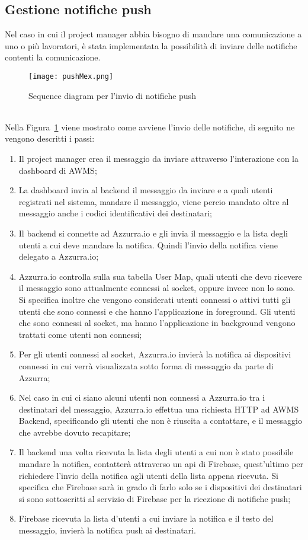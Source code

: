 \subsection{Gestione notifiche push}
Nel caso in cui il project manager abbia bisogno di mandare una comunicazione a uno o più lavoratori, è stata implementata la possibilità di inviare delle notifiche contenti la comunicazione.
\begin{figure}[h]
	\begin{center}
		\texttt{[image: pushMex.png]}
		\caption{Sequence diagram per l'invio di notifiche push}\label{fig:push}
	\end{center}
\end{figure}\\
Nella Figura~\ref{fig:push} viene mostrato come avviene l'invio delle notifiche, di seguito ne vengono descritti i passi:
\begin{enumerate}
	\item Il project manager crea il messaggio da inviare attraverso l'interazione con la dashboard di AWMS;
	\item La dashboard invia al backend il messaggio da inviare e a quali utenti registrati nel sistema, mandare il messaggio, viene percio mandato oltre al messaggio anche i codici identificativi dei destinatari;
	\item Il backend si connette ad Azzurra.io e gli invia il messaggio e la lista degli utenti a cui deve mandare la notifica. Quindi l'invio della notifica viene delegato a Azzurra.io; 
	\item Azzurra.io controlla sulla sua tabella User Map, quali utenti che devo ricevere il messaggio sono attualmente connessi al socket, oppure invece non lo sono. Si specifica inoltre che vengono considerati utenti connessi o attivi tutti gli utenti che sono connessi e che hanno l’applicazione in foreground. Gli utenti che sono connessi al socket, ma hanno l’applicazione in background vengono trattati come utenti non connessi;
	\item Per gli utenti connessi al socket, Azzurra.io invierà la notifica ai dispositivi connessi in cui verrà visualizzata sotto forma di messaggio da parte di Azzurra;
	\item Nel caso in cui ci siano alcuni utenti non connessi a Azzurra.io tra i destinatari del messaggio, Azzurra.io effettua una richiesta HTTP ad AWMS Backend, specificando gli utenti che non è riuscita a contattare, e il messaggio che avrebbe dovuto recapitare;
	\item Il backend una volta ricevuta la lista degli utenti a cui non è stato possibile mandare la notifica, contatterà attraverso un \gls{api}\ap{[g]} di Firebase, quest'ultimo per richiedere l'invio della notifica agli utenti della lista appena ricevuta. Si specifica che Firebase sarà in grado di farlo solo se i dispositivi dei destinatari si sono sottoscritti al servizio di Firebase per la ricezione di notifiche push;
	\item Firebase ricevuta la lista d'utenti a cui inviare la notifica e il testo del messaggio, invierà la notifica push ai destinatari.
\end{enumerate}